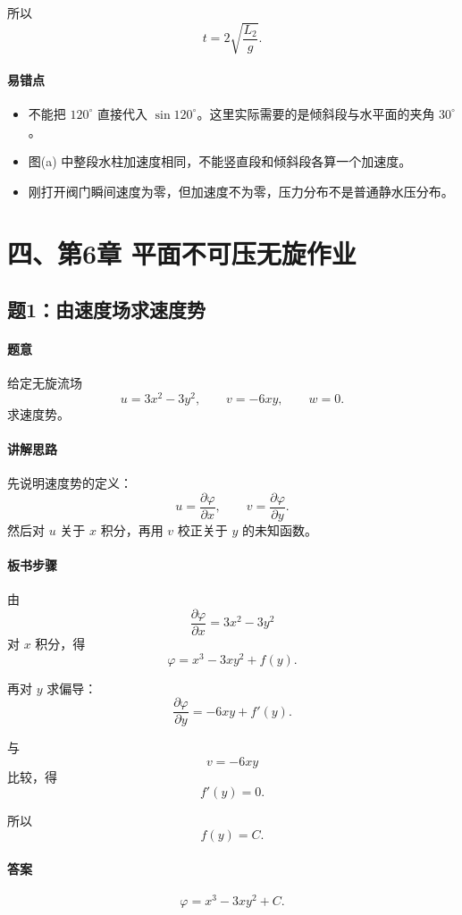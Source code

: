 \documentclass[12pt,a4paper]{ctexart}
\begin{document}
所以
\[
\boxed{
t=2\sqrt{\frac{L_2}{g}}.
}
\]

\paragraph{易错点}
\begin{itemize}
  \item 不能把 $120^\circ$ 直接代入 $\sin120^\circ$。这里实际需要的是倾斜段与水平面的夹角 $30^\circ$。
  \item 图(a) 中整段水柱加速度相同，不能竖直段和倾斜段各算一个加速度。
  \item 刚打开阀门瞬间速度为零，但加速度不为零，压力分布不是普通静水压分布。
\end{itemize}

\section*{四、第6章 平面不可压无旋作业}

\subsection*{题1：由速度场求速度势}

\paragraph{题意}
给定无旋流场
\[
u=3x^2-3y^2,\qquad v=-6xy,\qquad w=0.
\]
求速度势。

\paragraph{讲解思路}
先说明速度势的定义：
\[
u=\frac{\partial\varphi}{\partial x},\qquad
v=\frac{\partial\varphi}{\partial y}.
\]
然后对 $u$ 关于 $x$ 积分，再用 $v$ 校正关于 $y$ 的未知函数。

\paragraph{板书步骤}
由
\[
\frac{\partial\varphi}{\partial x}=3x^2-3y^2
\]
对 $x$ 积分，得
\[
\varphi=x^3-3xy^2+f(y).
\]

再对 $y$ 求偏导：
\[
\frac{\partial\varphi}{\partial y}
=-6xy+f'(y).
\]

与
\[
v=-6xy
\]
比较，得
\[
f'(y)=0.
\]

所以
\[
f(y)=C.
\]

\paragraph{答案}
\[
\boxed{
\varphi=x^3-3xy^2+C.
}
\]
\end{document}
